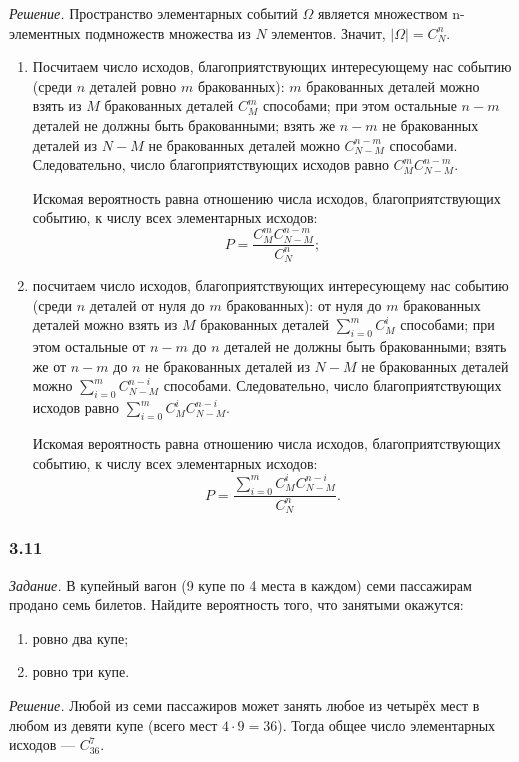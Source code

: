 \textit{Решение.} Пространство элементарных событий $ \Omega $ является множеством n-элементных подмножеств множества из $N$ элементов.
Значит, $| \Omega | = C_N^n$.

\begin{enumerate}[label=\alph*)]
\item Посчитаем число исходов,
благоприятствующих интересующему нас событию
(среди $n$ деталей ровно $m$ бракованных):
$m$ бракованных деталей можно взять из $M$ бракованных деталей $C_M^m$ способами;
при этом остальные $n - m$ деталей не должны быть бракованными;
взять же $n - m$ не бракованных деталей из $N - M$ не бракованных деталей можно $C_{N-M}^{n-m}$ способами.
Следовательно, число благоприятствующих исходов равно $C_M^m C_{N-M}^{n-m}$.

Искомая вероятность равна отношению числа исходов, благоприятствующих событию, к числу всех элементарных исходов:
$$P =
\frac{C_M^m C_{N-M}^{n-m}}{C_N^n};$$

\item посчитаем число исходов,
благоприятствующих интересующему нас событию
(среди $n$ деталей от нуля до $m$ бракованных):
от нуля до $m$ бракованных деталей можно взять из $M$ бракованных деталей $ \sum \limits_{i=0}^m C_M^i$ способами;
при этом остальные от $n - m$ до $n$ деталей не должны быть бракованными;
взять же от $n - m$ до $n$ не бракованных деталей из $N - M$ не бракованных деталей можно $ \sum \limits_{i=0}^m C_{N-M}^{n-i}$ способами.
Следовательно, число благоприятствующих исходов равно $ \sum \limits_{i=0}^m C_M^i C_{N-M}^{n-i}$.

Искомая вероятность равна отношению числа исходов, благоприятствующих событию, к числу всех элементарных исходов:
$$P =
\frac{ \sum \limits_{i=0}^m C_M^i C_{N-M}^{n-i}}{C_N^n}.$$
\end{enumerate}

\subsubsection*{3.11}

\textit{Задание.} В купейный вагон (9 купе по 4 места в каждом) семи пассажирам продано семь билетов.
Найдите вероятность того, что занятыми окажутся:
\begin{enumerate}[label=\alph*)]
\item ровно два купе;
\item ровно три купе.
\end{enumerate}

\textit{Решение.}
Любой из семи пассажиров может занять любое из четырёх мест в любом из девяти купе (всего мест $4 \cdot 9 = 36$).
Тогда общее число элементарных исходов --- $C_{36}^7$.


